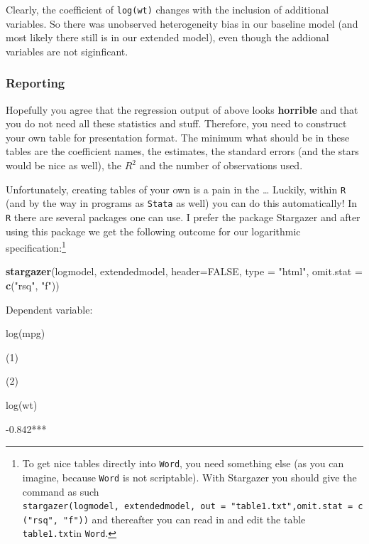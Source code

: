 \documentclass[]{article}
\newenvironment{Shaded}{\begin{snugshade}}{\end{snugshade}}
\newcommand{\KeywordTok}[1]{\textcolor[rgb]{0.13,0.29,0.53}{\textbf{{#1}}}}
\newcommand{\DataTypeTok}[1]{\textcolor[rgb]{0.13,0.29,0.53}{{#1}}}
\newcommand{\StringTok}[1]{\textcolor[rgb]{0.31,0.60,0.02}{{#1}}}
\newcommand{\OtherTok}[1]{\textcolor[rgb]{0.56,0.35,0.01}{{#1}}}
\newcommand{\NormalTok}[1]{{#1}}
\let\rmarkdownfootnote\footnote%
\def\footnote{\protect\rmarkdownfootnote}
\theoremstyle{definition}
\theoremstyle{definition}
\theoremstyle{definition}
\theoremstyle{remark}
\begin{document}
Clearly, the coefficient of \texttt{log(wt)} changes with the inclusion
of additional variables. So there was unobserved heterogeneity bias in
our baseline model (and most likely there still is in our extended
model), even though the addional variables are not siginficant.

\subsubsection{Reporting}\label{reporting}

Hopefully you agree that the regression output of above looks
\textbf{horrible} and that you do not need all these statistics and
stuff. Therefore, you need to construct your own table for presentation
format. The minimum what should be in these tables are the coefficient
names, the estimates, the standard errors (and the stars would be nice
as well), the \(R^2\) and the number of observations used.

Unfortunately, creating tables of your own is a pain in the \ldots{}
Luckily, within \texttt{R} (and by the way in programs as \texttt{Stata}
as well) you can do this automatically! In \texttt{R} there are several
packages one can use. I prefer the package Stargazer and after using
this package we get the following outcome for our logarithmic
specification:\footnote{To get nice tables directly into \texttt{Word},
  you need something else (as you can imagine, because \texttt{Word} is
  not scriptable). With Stargazer you should give the command as such
  \texttt{stargazer(logmodel,\ extendedmodel,\ out\ =\ "table1.txt",omit.stat\ =\ c("rsq",\ "f"))}
  and thereafter you can read in and edit the table
  \texttt{table1.txt}in \texttt{Word}.}

\begin{Shaded}
\begin{Highlighting}[]
\KeywordTok{stargazer}\NormalTok{(logmodel, extendedmodel, }\DataTypeTok{header=}\OtherTok{FALSE}\NormalTok{, }\DataTypeTok{type =} \StringTok{"html"}\NormalTok{, }\DataTypeTok{omit.stat =} \KeywordTok{c}\NormalTok{(}\StringTok{"rsq"}\NormalTok{, }\StringTok{"f"}\NormalTok{))}
\end{Highlighting}
\end{Shaded}

Dependent variable:

log(mpg)

(1)

(2)

log(wt)

-0.842***
\end{document}

